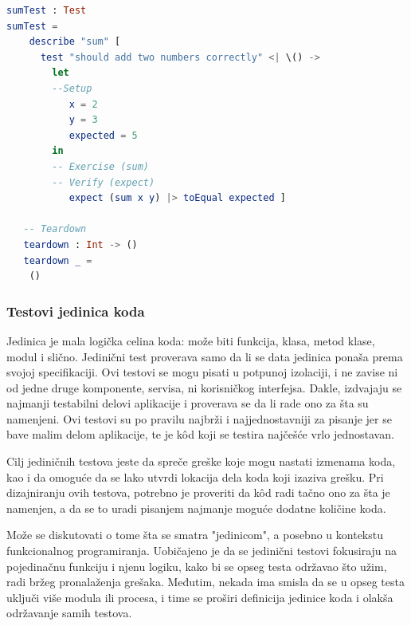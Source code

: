 \documentclass[12pt,oneside]{memoir}
\begin{document}
\begin{minipage}{\linewidth}
\begin{lstlisting}[language=elm, basicstyle=\small, caption={Četiri faze jediničnog testa koji proverava ispravnost
funkcije sabiranja dva broja},captionpos=b, label={lst:4ph}]
sumTest : Test
sumTest =
    describe "sum" [
      test "should add two numbers correctly" <| \() -> 
        let
        --Setup
           x = 2
           y = 3
           expected = 5
        in
        -- Exercise (sum)
        -- Verify (expect)
           expect (sum x y) |> toEqual expected ]

   -- Teardown
   teardown : Int -> ()
   teardown _ =
    ()
\end{lstlisting}
\end{minipage}

\subsubsection{Testovi jedinica koda}
\par Jedinica je mala logička celina koda: može biti funkcija, klasa, metod klase, modul i slično. Jedinični test proverava samo da li se data jedinica ponaša prema svojoj specifikaciji. Ovi testovi se mogu pisati u potpunoj izolaciji, i ne zavise ni od jedne druge komponente, servisa, ni korisničkog interfejsa. Dakle, izdvajaju se najmanji testabilni delovi aplikacije i proverava se da li rade ono za šta su namenjeni. Ovi testovi su po pravilu najbrži i  najjednostavniji za pisanje jer se bave malim delom aplikacije, te je k\^{o}d koji se testira najčešće vrlo jednostavan. 
\par Cilj jediničnih testova jeste da spreče greške koje mogu nastati izmenama koda, kao i da omoguće da se lako utvrdi lokacija dela koda koji izaziva grešku. Pri dizajniranju ovih testova, potrebno je proveriti da k\^{o}d radi tačno ono za šta je namenjen, a da se to uradi pisanjem najmanje moguće dodatne količine koda.
\par Može se diskutovati o tome šta se smatra "jedinicom", a posebno u kontekstu funkcionalnog programiranja. Uobičajeno je da se jedinični testovi fokusiraju na pojedinačnu funkciju i njenu logiku, kako bi se opseg testa održavao što užim, radi bržeg pronalaženja grešaka. Međutim, nekada ima smisla da se u opseg testa uključi više modula ili procesa, i time se proširi definicija jedinice koda i olakša održavanje samih testova. 
\end{document}
